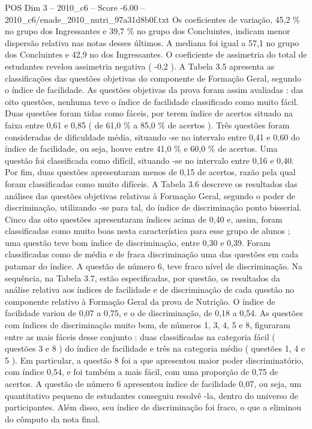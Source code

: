 \begin{textsample}{POS Dim 3 – 2010\_c6 – Score -6.00 – 2010\_c6/enade\_2010\_nutri\_97a31d8b0f.txt}
Os coeficientes de variação, 45,2 \% no grupo dos Ingressantes e 39,7 \% no grupo dos Concluintes, indicam menor dispersão relativa nas notas desses últimos.
A mediana foi igual a 57,1 no grupo dos Concluintes e 42,9 no dos Ingressantes.
O coeficiente de assimetria do total de estudantes revelou assimetria negativa ( -0,2 ).
A Tabela 3.5 apresenta as classificações das questões objetivas do componente de Formação Geral, segundo o índice de facilidade.
As questões objetivas da prova foram assim avaliadas : das oito questões, nenhuma teve o índice de facilidade classificado como muito fácil.
Duas questões foram tidas como fáceis, por terem índice de acertos situado na faixa entre 0,61 e 0,85 ( de 61,0 \% a 85,0 \% de acertos ).
Três questões foram consideradas de dificuldade média, situando -se no intervalo entre 0,41 e 0,60 do índice de facilidade, ou seja, houve entre 41,0 \% e 60,0 \% de acertos.
Uma questão foi classificada como difícil, situando -se no intervalo entre 0,16 e 0,40.
Por fim, duas questões apresentaram menos de 0,15 de acertos, razão pela qual foram classificadas como muito difíceis.
A Tabela 3.6 descreve os resultados das análises das questões objetivas relativas à Formação Geral, segundo o poder de discriminação, utilizando -se para tal, do índice de discriminação ponto bisserial.
Cinco das oito questões apresentaram índices acima de 0,40 e, assim, foram classificadas como muito boas nesta característica para esse grupo de alunos ; uma questão teve bom índice de discriminação, entre 0,30 e 0,39.
Foram classificadas como de média e de fraca discriminação uma das questões em cada patamar do índice.
A questão de número 6, teve fraco nível de discriminação.
Na sequência, na Tabela 3.7, estão especificadas, por questão, os resultados da análise relativa aos índices de facilidade e de discriminação de cada questão no componente relativo à Formação Geral da prova de Nutrição.
O índice de facilidade variou de 0,07 a 0,75, e o de discriminação, de 0,18 a 0,54.
As questões com índices de discriminação muito bom, de números 1, 3, 4, 5 e 8, figuraram entre as mais fáceis desse conjunto : duas classificadas na categoria fácil ( questões 3 e 8 ) do índice de facilidade e três na categoria médio ( questões 1, 4 e 5 ).
Em particular, a questão 8 foi a que apresentou maior poder discriminatório, com índice 0,54, e foi também a mais fácil, com uma proporção de 0,75 de acertos.
A questão de número 6 apresentou índice de facilidade 0,07, ou seja, um quantitativo pequeno de estudantes conseguiu resolvê -la, dentro do universo de participantes.
Além disso, seu índice de discriminação foi fraco, o que a eliminou do cômputo da nota final.

\end{textsample}
